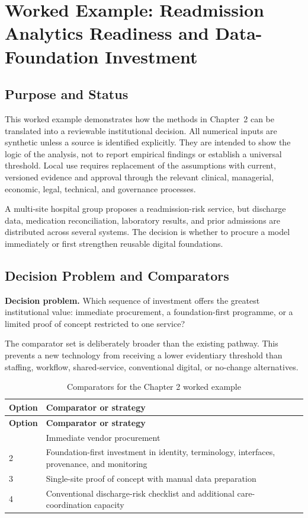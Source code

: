 \section{Worked Example: Readmission Analytics Readiness and Data-Foundation Investment}
\label{sec:comp-ch02-worked-example}

\subsection{Purpose and Status}
This worked example demonstrates how the methods in Chapter~2 can be
translated into a reviewable institutional decision. All numerical inputs are
synthetic unless a source is identified explicitly. They are intended to show the
logic of the analysis, not to report empirical findings or establish a universal
threshold. Local use requires replacement of the assumptions with current,
versioned evidence and approval through the relevant clinical, managerial,
economic, legal, technical, and governance processes.

A multi-site hospital group proposes a readmission-risk service, but discharge data, medication reconciliation, laboratory results, and prior admissions are distributed across several systems. The decision is whether to procure a model immediately or first strengthen reusable digital foundations. 

\subsection{Decision Problem and Comparators}
\textbf{Decision problem.} Which sequence of investment offers the greatest institutional value: immediate procurement, a foundation-first programme, or a limited proof of concept restricted to one service?

The comparator set is deliberately broader than the existing pathway. This prevents
a new technology from receiving a lower evidentiary threshold than staffing,
workflow, shared-service, conventional digital, or no-change alternatives.

\begin{longtable}{@{}p{}p{}@{}}
\caption{Comparators for the Chapter 2 worked example}
\label{tab:comp-ch02-comparators}\\
\toprule
\textbf{Option} & \textbf{Comparator or strategy} \\
\midrule
\endfirsthead
\toprule
\textbf{Option} & \textbf{Comparator or strategy} \\
\midrule
\endhead
\bottomrule
\endlastfoot
1 & Immediate vendor procurement \\
2 & Foundation-first investment in identity, terminology, interfaces, provenance, and monitoring \\
3 & Single-site proof of concept with manual data preparation \\
4 & Conventional discharge-risk checklist and additional care-coordination capacity \\
\end{longtable}

